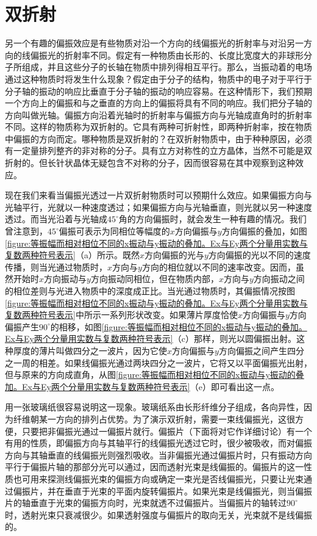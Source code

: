 \section{双折射}

另一个有趣的偏振效应是有些物质对沿一个方向的线偏振光的折射率与对沿另一方向的线偏振光的折射率不同。假定有一种物质由长形的、长度比宽度大的非球形分子所组成，并且这些分子的长轴在物质中排列得相互平行。那么，当振动着的电场通过这种物质时将发生什么现象？假定由于分子的结构，物质中的电子对于平行于分子轴的振动的响应比垂直于分子轴的振动的响应容易。在这种情形下，我们预期一个方向上的偏振和与之垂直的方向上的偏振将具有不同的响应。我们把分子轴的方向叫做光轴。偏振方向沿着光轴时的折射率与偏振方向与光轴成直角时的折射率不同。这样的物质称为双折射的。它具有两种可折射性，即两种折射率，按在物质中偏振的方向而定。哪种物质是双折射的？在双折射物质中，由于种种原因，必须有一定量排列整齐的非对称的分子。具有立方对称性的立方晶体，当然不可能是双折射的。但长针状晶体无疑包含不对称的分子，因而很容易在其中观察到这种效应。

现在我们来看当偏振光透过一片双折射物质时可以预期什么效应。如果偏振方向与光轴平行，光就以一种速度透过；如果偏振方向与光轴垂直，则光就以另一种速度透过。而当光沿着与光轴成$45^\circ$角的方向偏振时，就会发生一种有趣的情况。我们曾注意到，$45^\circ$偏振可表示为同相位等幅度的$x$方向偏振与$y$方向偏振的叠加，如图\ref{figure:等振幅而相对相位不同的x振动与y振动的叠加。Ex与Ey两个分量用实数与复数两种符号表示}（a）所示。既然$x$方向偏振的光与$y$方向偏振的光以不同的速度传播，则当光通过物质时，$x$方向与$y$方向的相位就以不同的速率改变。因而，虽然开始时$x$方向振动与$y$方向振动同相位，但在物质内部，$x$方向与$y$方向振动之间的相位差则与光进入物质中的深度成正比。当光通过物质时，其偏振情况按图\ref{figure:等振幅而相对相位不同的x振动与y振动的叠加。Ex与Ey两个分量用实数与复数两种符号表示}中所示一系列形状改变。如果薄片厚度恰使$x$方向偏振与$y$方向偏振产生$90^\circ$的相移，如图\ref{figure:等振幅而相对相位不同的x振动与y振动的叠加。Ex与Ey两个分量用实数与复数两种符号表示}（c）那样，则光以圆偏振出射。这种厚度的薄片叫做四分之一波片，因为它使$x$方向偏振与$y$方向偏振之间产生四分之一周的相差。如果线偏振光通过两块四分之一波片，它将又以平面偏振光出射，但与原来的方向成直角，从图\ref{figure:等振幅而相对相位不同的x振动与y振动的叠加。Ex与Ey两个分量用实数与复数两种符号表示}（e）即可看出这一点。

用一张玻璃纸很容易说明这一现象。玻璃纸系由长形纤维分子组成，各向异性，因为纤维朝某一方向的排列占优势。为了演示双折射，需要一束线偏振光，这很方便，只要把非偏振光通过一偏振片就行。偏振片（下面将对它作详细讨论）有一个有用的性质，即偏振方向与其轴平行的线偏振光透过它时，很少被吸收，而对偏振方向与其轴垂直的线偏振光则强烈吸收。当非偏振光通过偏振片时，只有振动方向平行于偏振片轴的那部分光可以通过，因而透射光束是线偏振的。偏振片的这一性质也可用来探测线偏振光束的偏振方向或确定一束光是否线偏振光，只要让光束通过偏振片，并在垂直于光束的平面内旋转偏振片。如果光束是线偏振光，则当偏振片的轴垂直于光束的偏振方向时，光束就透不过偏振片。当偏振片的轴转过$90^\circ$时，透射光束只衰减很少。如果透射强度与偏振片的取向无关，光束就不是线偏振的。

